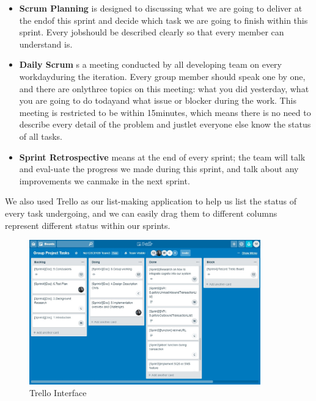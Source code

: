 \documentclass[runningheads]{llncs}
\begin{document}
\begin{itemize}
	\item \textbf{Scrum Planning} is designed to discussing what we are going to deliver at the endof this sprint and decide which task we are going to finish within this sprint. Every jobshould be described clearly so that every member can understand is.
	\item \textbf{Daily Scrum} s a meeting conducted by all developing team on every workdayduring the iteration. Every group member should speak one by one, and there are onlythree topics on this meeting: what you did yesterday, what you are going to do todayand what issue or blocker during the work. This meeting is restricted to be within 15minutes, which means there is no need to describe every detail of the problem and justlet everyone else know the status of all tasks.
	\item \textbf{Sprint Retrospective} means at the end of every sprint; the team will talk and eval-uate the progress we made during this sprint, and talk about any improvements we canmake in the next sprint.
\end{itemize}

We also used Trello\cite{trelloapp} as our list-making application to help us list the status of every task undergoing, and we can easily drag them to different columns represent different status within our sprints.

	\begin{figure}[H]
		\centering
		\includegraphics[width=10cm]{reportpics/10.jpg}  
		\caption{Trello Interface}
		\label{trello interface}
	\end{figure}
\end{document}

